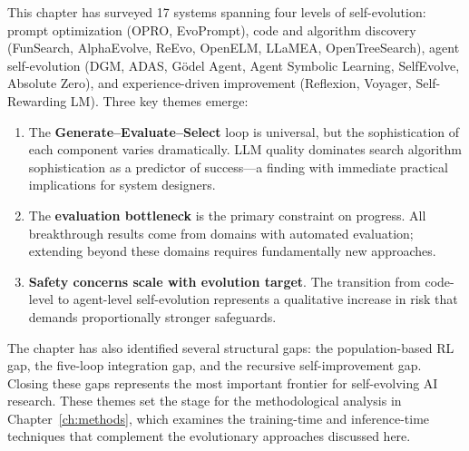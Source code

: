 This chapter has surveyed 17 systems spanning four levels of self-evolution: prompt optimization (OPRO, EvoPrompt), code and algorithm discovery (FunSearch, AlphaEvolve, ReEvo, OpenELM, LLaMEA, OpenTreeSearch), agent self-evolution (DGM, ADAS, G\"{o}del Agent, Agent Symbolic Learning, SelfEvolve, Absolute Zero), and experience-driven improvement (Reflexion, Voyager, Self-Rewarding LM). Three key themes emerge:

\begin{enumerate}
    \item The \textbf{Generate--Evaluate--Select} loop is universal, but the sophistication of each component varies dramatically. LLM quality dominates search algorithm sophistication as a predictor of success---a finding with immediate practical implications for system designers.
    \item The \textbf{evaluation bottleneck} is the primary constraint on progress. All breakthrough results come from domains with automated evaluation; extending beyond these domains requires fundamentally new approaches.
    \item \textbf{Safety concerns scale with evolution target}. The transition from code-level to agent-level self-evolution represents a qualitative increase in risk that demands proportionally stronger safeguards.
\end{enumerate}

The chapter has also identified several structural gaps: the population-based RL gap, the five-loop integration gap, and the recursive self-improvement gap. Closing these gaps represents the most important frontier for self-evolving AI research. These themes set the stage for the methodological analysis in Chapter~\ref{ch:methods}, which examines the training-time and inference-time techniques that complement the evolutionary approaches discussed here.
